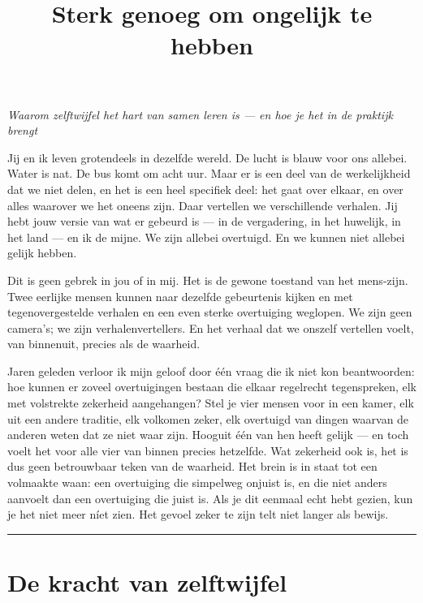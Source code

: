 \documentclass{article}
\title{Sterk genoeg om ongelijk te hebben}
\author{}
\date{}
\begin{document}
\maketitle

\begin{center}
\large \textit{Waarom zelftwijfel het hart van samen leren is --- en hoe je het in de praktijk brengt}
\end{center}

\vspace{1em}

Jij en ik leven grotendeels in dezelfde wereld. De lucht is blauw voor ons allebei. Water is nat. De bus komt om acht uur. Maar er is een deel van de werkelijkheid dat we niet delen, en het is een heel specifiek deel: het gaat over elkaar, en over alles waarover we het oneens zijn. Daar vertellen we verschillende verhalen. Jij hebt jouw versie van wat er gebeurd is --- in de vergadering, in het huwelijk, in het land --- en ik de mijne. We zijn allebei overtuigd. En we kunnen niet allebei gelijk hebben.

Dit is geen gebrek in jou of in mij. Het is de gewone toestand van het mens-zijn. Twee eerlijke mensen kunnen naar dezelfde gebeurtenis kijken en met tegenovergestelde verhalen en een even sterke overtuiging weglopen. We zijn geen camera's; we zijn verhalenvertellers. En het verhaal dat we onszelf vertellen voelt, van binnenuit, precies als de waarheid.

Jaren geleden verloor ik mijn geloof door één vraag die ik niet kon beantwoorden: hoe kunnen er zoveel overtuigingen bestaan die elkaar regelrecht tegenspreken, elk met volstrekte zekerheid aangehangen? Stel je vier mensen voor in een kamer, elk uit een andere traditie, elk volkomen zeker, elk overtuigd van dingen waarvan de anderen weten dat ze niet waar zijn. Hooguit één van hen heeft gelijk --- en toch voelt het voor alle vier van binnen precies hetzelfde. Wat zekerheid ook is, het is dus geen betrouwbaar teken van de waarheid. Het brein is in staat tot een volmaakte waan: een overtuiging die simpelweg onjuist is, en die niet anders aanvoelt dan een overtuiging die juist is. Als je dit eenmaal echt hebt gezien, kun je het niet meer níet zien. Het gevoel zeker te zijn telt niet langer als bewijs.

\hrule

\section*{De kracht van zelftwijfel}
\end{document}

